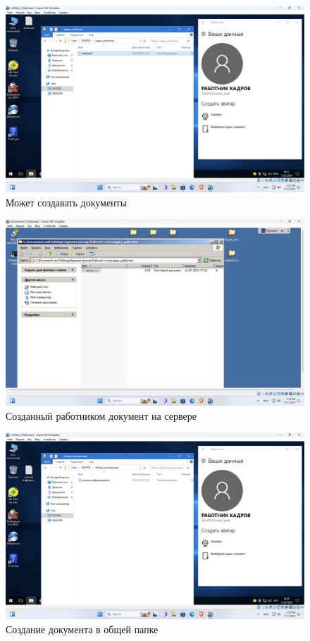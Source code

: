 \begin{figure}[H]
  \centering
  \includegraphics[width=1\textwidth]{pict/prac/29}
  \caption{Может создавать документы}
  \label{fig:28}
\end{figure}

\begin{figure}[H]
  \centering
  \includegraphics[width=1\textwidth]{pict/prac/30}
  \caption{Созданный работником документ на сервере}
  \label{fig:29}
\end{figure}


\begin{figure}[H]
  \centering
  \includegraphics[width=1\textwidth]{pict/prac/33}
  \caption{Создание документа в общей папке}
  \label{fig:32}
\end{figure}

